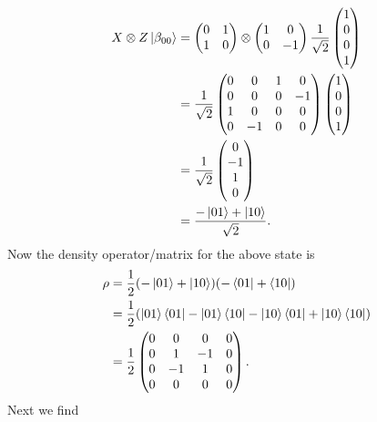 \documentclass[10pt]{article}
\begin{document}
\begin{align*}
X \otimes Z \ket{\beta_{00}} &= 
\begin{pmatrix}
0 & 1 \\
1 & 0
\end{pmatrix}
\otimes
\begin{pmatrix}
1 & 0 \\
0 & -1 
\end{pmatrix}
\frac{1}{\sqrt{2}}
\begin{pmatrix}
1 \\ 0 \\ 0 \\ 1
\end{pmatrix} \\
&= 
\frac{1}{\sqrt{2}}
\begin{pmatrix}
0 & 0 & 1 & 0 \\
0 & 0 & 0 & -1 \\
1 & 0 & 0 & 0 \\
0 & -1 & 0 & 0
\end{pmatrix}
\begin{pmatrix}
1 \\ 0 \\ 0 \\ 1
\end{pmatrix} \\
&= 
\frac{1}{\sqrt{2}}
\begin{pmatrix}
0 \\ -1 \\ 1 \\ 0
\end{pmatrix} \\
&= \frac{-\ket{01} + \ket{10}}{\sqrt{2}}.
\end{align*}
Now the density operator/matrix for the above state is 
\begin{align*}
\rho &= \frac{1}{2} (-\ket{01} + \ket{10}) (-\bra{01} + \bra{10}) \\
        &= \frac{1}{2} ( \ket{01} \bra{01} - \ket{01} \bra{10} - \ket{10} \bra{01} + \ket{10} \bra{10} ) \\
        &= 
	    \frac{1}{2}        
        \begin{pmatrix}
        0 & 0   & 0   & 0 \\
        0 & 1   & -1 & 0 \\
        0 & -1 & 1   & 0 \\
        0 & 0   & 0   & 0 
        \end{pmatrix}.
\end{align*}
Next we find
\end{document}

